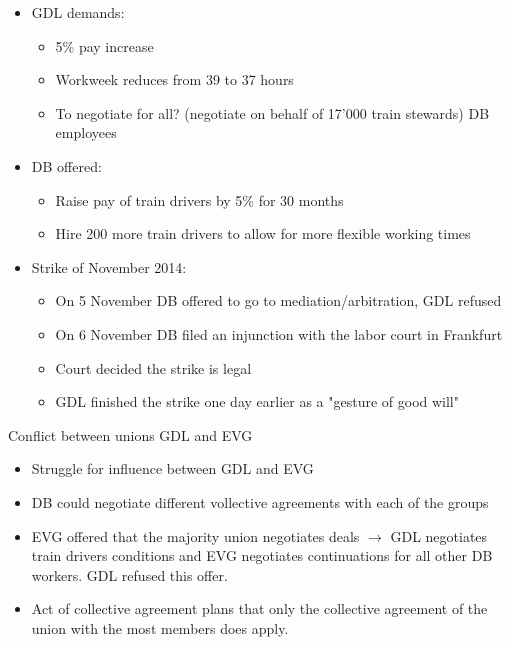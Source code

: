 \begin{itemize}
    \item GDL demands:
        \begin{itemize}
            \item 5\% pay increase
            \item Workweek reduces from 39 to 37 hours
            \item To negotiate for all? (negotiate on behalf of 17'000 train
                stewards) DB employees
        \end{itemize}
    \item DB offered:
        \begin{itemize}
            \item Raise pay of train drivers by 5\% for 30 months
            \item Hire 200 more train drivers to allow for more flexible
                working times
        \end{itemize}
    \item Strike of November 2014:
        \begin{itemize}
            \item On 5 November DB offered to go to mediation/arbitration, GDL refused
            \item On 6 November DB filed an injunction with the labor court in Frankfurt
            \item Court decided the strike is legal
            \item GDL finished the strike one day earlier as a "gesture of good will"
        \end{itemize}
\end{itemize}

Conflict between unions GDL and EVG
\begin{itemize}
    \item Struggle for influence between GDL and EVG
    \item DB could negotiate different vollective agreements with each of the
        groups
    \item EVG offered that the majority union negotiates deals $\rightarrow$
        GDL negotiates train drivers conditions and EVG negotiates continuations
        for all other DB workers. GDL refused this offer.
    \item Act of collective agreement plans that only the collective agreement
        of the union with the most members does apply.
\end{itemize}

